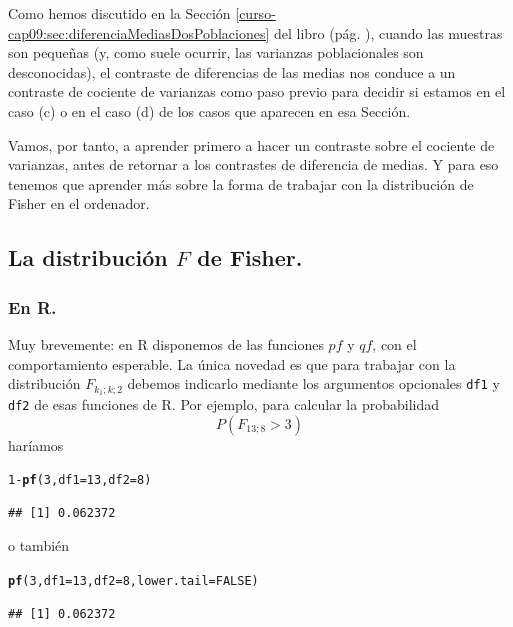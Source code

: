 \documentclass[10pt,a4paper]{article}\usepackage[]{graphicx}\usepackage[]{color}
\makeatletter
\newcommand{\hlnum}[1]{\textcolor[rgb]{0.686,0.059,0.569}{#1}}%
\newcommand{\hlopt}[1]{\textcolor[rgb]{0,0,0}{#1}}%
\newcommand{\hlstd}[1]{\textcolor[rgb]{0.345,0.345,0.345}{#1}}%
\newcommand{\hlkwc}[1]{\textcolor[rgb]{0.333,0.667,0.333}{#1}}%
\newcommand{\hlkwd}[1]{\textcolor[rgb]{0.737,0.353,0.396}{\textbf{#1}}}%
\newenvironment{kframe}{%
 \def\at@end@of@kframe{}%
 \ifinner\ifhmode%
  \def\at@end@of@kframe{\end{minipage}}%
  \begin{minipage}{\columnwidth}%
 \fi\fi%
 \def\FrameCommand##1{\hskip\@totalleftmargin \hskip-\fboxsep
 \colorbox{shadecolor}{##1}\hskip-\fboxsep
     \hskip-\linewidth \hskip-\@totalleftmargin \hskip\columnwidth}%
 \MakeFramed {\advance\hsize-\width
   \@totalleftmargin\z@ \linewidth\hsize
   \@setminipage}}%
 {\par\unskip\endMakeFramed%
 \at@end@of@kframe}
\newenvironment{knitrout}{}{} %
\newcounter {cont01}
\makeatother
\begin{document}
Como hemos discutido en la Sección \ref{curso-cap09:sec:diferenciaMediasDosPoblaciones} del libro (pág. \pageref{curso-cap09:sec:diferenciaMediasDosPoblaciones}), cuando las muestras son pequeñas (y, como suele ocurrir, las varianzas poblacionales son desconocidas), el contraste de diferencias de las medias nos conduce a un contraste de cociente de varianzas como paso previo para decidir si estamos en el caso (c) o en el caso (d) de los casos que aparecen en esa Sección.

Vamos, por tanto, a aprender primero a hacer un contraste sobre el cociente de varianzas, antes de retornar a los contrastes de diferencia de medias. Y para eso tenemos que aprender más sobre la forma de trabajar con la distribución de Fisher en el ordenador.

\subsection{La distribución $F$ de Fisher.}
\label{tut09:sec:DistribucionChiCuadrado}

\subsubsection*{En R.}

Muy brevemente: en R disponemos de las funciones $pf$ y $qf$, con el comportamiento esperable.  La única novedad es que para trabajar con la distribución $F_{k_1;k;2}$ debemos indicarlo mediante los argumentos opcionales {\tt df1} y {\tt df2} de esas funciones de R. Por ejemplo, para calcular la probabilidad
\[P(F_{13;8} > 3)\]
haríamos
\begin{knitrout}
\color{fgcolor}\begin{kframe}
\begin{alltt}
\hlnum{1} \hlopt{-} \hlkwd{pf}\hlstd{(}\hlnum{3}\hlstd{,} \hlkwc{df1}\hlstd{=}\hlnum{13}\hlstd{,} \hlkwc{df2}\hlstd{=}\hlnum{8}\hlstd{)}
\end{alltt}
\begin{verbatim}
## [1] 0.062372
\end{verbatim}
\end{kframe}
\end{knitrout}
o también
\begin{knitrout}
\color{fgcolor}\begin{kframe}
\begin{alltt}
\hlkwd{pf}\hlstd{(}\hlnum{3}\hlstd{,} \hlkwc{df1}\hlstd{=}\hlnum{13}\hlstd{,} \hlkwc{df2}\hlstd{=}\hlnum{8}\hlstd{,} \hlkwc{lower.tail}\hlstd{=}\hlnum{FALSE}\hlstd{)}
\end{alltt}
\begin{verbatim}
## [1] 0.062372
\end{verbatim}
\end{kframe}
\end{knitrout}
\end{document}
